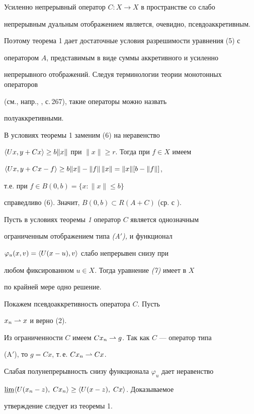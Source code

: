  


\begin{note} Усиленно непрерывный оператор $C:X\to X$ в пространстве со слабо 


непрерывным дуальным отображением является, очевидно, псевдоаккретивным. 


Поэтому теорема 1 дает достаточные условия разрешимости уравнения (5) с 


оператором $A$, представимым в виде суммы аккретивного и усиленно 


непрерывного отображений. Следуя терминологии теории монотонных операторов 


(см., напр., \cite{Vai}, с.\,267), такие операторы можно назвать 


полуаккретивными. 


\end{note} 


 


\begin{note} В условиях теоремы 1 заменим (6) на неравенство 


$\langle Ux,y+Cx\rangle\ge b\|x\|$ при $\|x\|\ge r$. Тогда при $f\in X$ имеем 


$\langle Ux, y+Cx-f\rangle\ge b\|x\|-\|f\|\,\|x\|=\|x\|[b-\|f\|]$, 


т.е. при $f\in B(0,b)=\{x:\|x\|\le b\}$ 


справедливо (6). Значит, $B(0,b)\subset R(A+C)$ (ср. с \cite{Mor}). 


\end{note} 


 


\begin{thm} Пусть в условиях теоремы {\em 1} оператор $C$ является однозначным 


ограниченным отображением типа {\em (A$'$),} и функционал 


$\varphi_u(x,v)=\langle U(x-u),v\rangle$ слабо непрерывен снизу при 


любом фиксированном $u\in X$. Тогда уравнение {\em (7)} имеет в $X$ 


по крайней мере одно решение. 


\end{thm} 


 


\begin{pf} Покажем псевдоаккретивность оператора $C$. Пусть 


$x_n\rightharpoonup x$ и верно (2). 


Из ограниченности $C$ имеем $Cx_n\rightharpoonup g$. Так как $C$ --- оператор типа 


(A$'$), то $g=Cx$, т.\,е. $Cx_n\rightharpoonup Cx$. 


Слабая полунепрерывность снизу функционала $\varphi_u$ дает неравенство 


$\underline{\lim}\langle U(x_n-z),\;Cx_n\rangle\ge\langle U(x-z),\;Cx\rangle$. Доказываемое 


утверждение следует из теоремы 1. 


\end{pf} 


